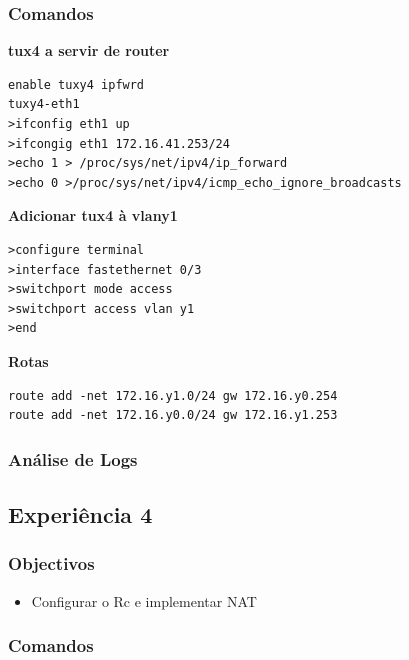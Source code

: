 \documentclass[a4paper,11pt]{article}
\begin{document}
\subsubsection{Comandos}

\textbf{tux4 a servir de router}

\begin{lstlisting}
enable tuxy4 ipfwrd
tuxy4-eth1
>ifconfig eth1 up
>ifcongig eth1 172.16.41.253/24
>echo 1 > /proc/sys/net/ipv4/ip_forward
>echo 0 >/proc/sys/net/ipv4/icmp_echo_ignore_broadcasts
\end{lstlisting}

\textbf{Adicionar tux4 à vlany1}

\begin{lstlisting}
>configure terminal
>interface fastethernet 0/3
>switchport mode access
>switchport access vlan y1
>end
\end{lstlisting}

\textbf{Rotas}

\begin{lstlisting}
route add -net 172.16.y1.0/24 gw 172.16.y0.254
route add -net 172.16.y0.0/24 gw 172.16.y1.253
\end{lstlisting}

\subsubsection{Análise de Logs}

\subsection{Experiência 4}
\subsubsection{Objectivos}

\begin{itemize}
\item Configurar o Rc e implementar NAT
\end{itemize}

\subsubsection{Comandos}
\end{document}
